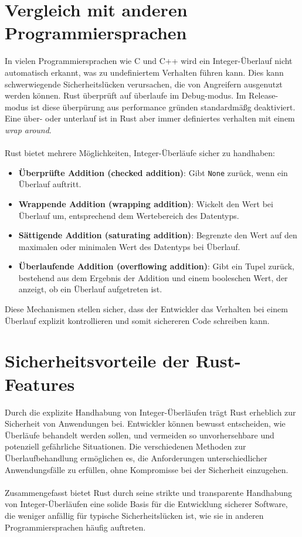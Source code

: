 \section{Vergleich mit anderen Programmiersprachen}

In vielen Programmiersprachen wie C und C++ wird ein Integer-Überlauf nicht automatisch erkannt, was zu undefiniertem Verhalten führen kann. 
Dies kann schwerwiegende Sicherheitslücken verursachen, die von Angreifern ausgenutzt werden können.
Rust überprüft auf überlaufe im Debug-modus.
Im Release-modus ist diese überpürung aus performance gründen standardmäßg deaktiviert.
Eine über- oder unterlauf ist in Rust aber immer definiertes verhalten mit einem \textit{wrap around}.\\
\\
Rust bietet mehrere Möglichkeiten, Integer-Überläufe sicher zu handhaben:

\begin{itemize}
    \item \textbf{Überprüfte Addition (checked addition)}: Gibt \texttt{None} zurück, wenn ein Überlauf auftritt.
    \item \textbf{Wrappende Addition (wrapping addition)}: Wickelt den Wert bei Überlauf um, entsprechend dem Wertebereich des Datentyps.
    \item \textbf{Sättigende Addition (saturating addition)}: Begrenzte den Wert auf den maximalen oder minimalen Wert des Datentyps bei Überlauf.
    \item \textbf{Überlaufende Addition (overflowing addition)}: Gibt ein Tupel zurück, bestehend aus dem Ergebnis der Addition und einem booleschen Wert, der anzeigt, ob ein Überlauf aufgetreten ist.
\end{itemize}
\noindent
Diese Mechanismen stellen sicher, dass der Entwickler das Verhalten bei einem Überlauf explizit kontrollieren und somit sichereren Code schreiben kann.

\section{Sicherheitsvorteile der Rust-Features}

Durch die explizite Handhabung von Integer-Überläufen trägt Rust erheblich zur Sicherheit von Anwendungen bei. 
Entwickler können bewusst entscheiden, wie Überläufe behandelt werden sollen, und vermeiden so unvorhersehbare und potenziell gefährliche Situationen. 
Die verschiedenen Methoden zur Überlaufbehandlung ermöglichen es, die Anforderungen unterschiedlicher Anwendungsfälle zu erfüllen, ohne Kompromisse bei der Sicherheit einzugehen.\\
\\
Zusammengefasst bietet Rust durch seine strikte und transparente Handhabung von Integer-Überläufen eine solide Basis für die Entwicklung sicherer Software, die weniger anfällig für typische Sicherheitslücken ist, wie sie in anderen Programmiersprachen häufig auftreten.

